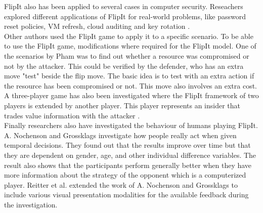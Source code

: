 FlipIt also has been applied to several cases in computer security. Reseachers explored different applications of FlipIt for real-world problems, like password reset policies, VM refresh, cloud auditing and key rotation \cite{ApplyingFlipit}. \\
Other authors used the FlipIt game to apply it to a specific scenario. To be able to use the FlipIt game, modifications where required for the FlipIt model.
One of the scenarios by Pham \cite{compromised} was to find out whether a resource was compromised or not by the attacker. This could be verified by the defender, who has an extra move "test" beside the flip move. The basic idea is to test with an extra action if the resource has been compromised or not. This move also involves an extra cost.\\
A three-player game has also been investigated where the FlipIt framework of two players is extended by another player. This player represents an insider that trades value information with the attacker \cite{fengstealthy}.\\


Finally researchers also have investigated the behaviour of humans playing FlipIt. A. Nochenson and Grossklags \cite{nochenson2013behavioral}  investigate how people really act when given temporal decisions. They found out that the results improve over time but that they are dependent on gender, age, and other individual difference variables. The result also shows that the participants perform generally better when they have more information about the strategy of the opponent which is a computerized player. Reitter et al. \cite{reitter2013risk} extended the work of A. Nochenson and Grossklags to include various visual presentation modalities for the available feedback during the investigation.\\







